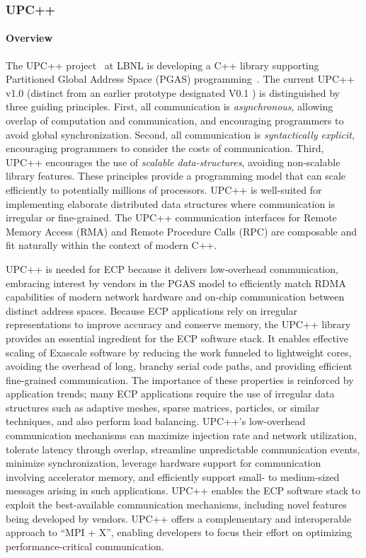 \subsubsection{ UPC++} 
\paragraph{Overview} 
The UPC++ project~\cite{upcxx-site} at LBNL is developing a C++ library
supporting Partitioned Global Address Space (PGAS) programming~\cite{Bachan:paw17,upcxx-spec}.
The current UPC++ v1.0 (distinct from an earlier prototype designated V0.1
\cite{zheng:ipdps14}) is distinguished by three guiding principles.
First, all communication is \emph{asynchronous}, allowing overlap of computation and
communication, and encouraging programmers to avoid global synchronization. Second, all communication
is \emph{syntactically explicit}, encouraging programmers to consider the costs of communication. Third,
UPC++ encourages the use of \emph{scalable data-structures},
avoiding non-scalable library features.
These principles provide a programming model that can
scale efficiently to potentially millions of processors.
UPC++ is well-suited for implementing elaborate distributed data structures where
communication is irregular or fine-grained. 
The UPC++ communication interfaces for Remote Memory Access (RMA) 
and Remote Procedure Calls (RPC)
are composable and fit naturally within the context of modern C++.

UPC++ is needed for ECP because it delivers low-overhead communication,
embracing interest by vendors in the PGAS model to
efficiently match RDMA capabilities of modern
network hardware and on-chip communication between distinct address
spaces.  
Because ECP applications rely on irregular representations
to improve accuracy and conserve memory, the UPC++ library provides
an essential ingredient for the ECP software stack.  It enables
effective scaling of Exascale software by reducing the work funneled
to lightweight cores, avoiding the overhead of long, branchy serial
code paths, and providing efficient fine-grained communication.  The
importance of these properties is reinforced by application trends;
many ECP applications require the use of irregular data structures such as 
adaptive meshes, sparse
matrices, particles, or similar techniques, and also perform load balancing.  UPC++'s
low-overhead communication mechanisms can maximize injection rate and
network utilization, tolerate latency through overlap, streamline
unpredictable communication events, minimize synchronization,
leverage hardware support for communication involving accelerator memory,
and efficiently support small- to medium-sized messages arising in such
applications.  UPC++ enables the ECP software stack to exploit
the best-available communication mechanisms, including novel features
being developed by vendors.  UPC++ offers a complementary and
interoperable approach to ``MPI + X'', enabling developers to
focus their effort on optimizing performance-critical communication.


